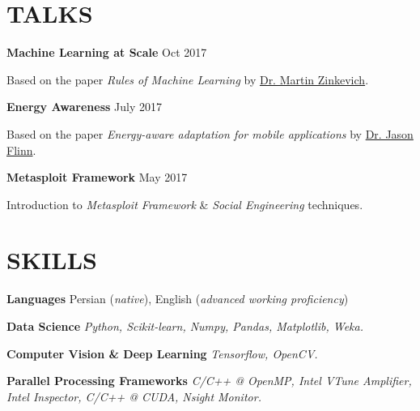 \documentclass[margin, 10pt]{res} %
\begin{document}
\section{TALKS} 
\textbf{Machine Learning at Scale}
\hfill {Oct 2017}
\vspace{0.15cm}
\begin{innerlist}
	\item Based on the paper \textit{Rules of Machine Learning} by \href{http://martin.zinkevich.org/rules_of_ml/rules_of_ml.pdf}{Dr. Martin Zinkevich}.
\end{innerlist}

\textbf{Energy Awareness}
\hfill {July 2017}
\vspace{0.15cm}
\begin{innerlist}
	\item Based on the paper \textit{Energy-aware adaptation for mobile applications} by \href{http://www-cgi.cs.cmu.edu/afs/cs.cmu.edu/Web/People/odyssey/docdir/s17.pdf5}{Dr. Jason Flinn}.
\end{innerlist}

\textbf{Metasploit Framework}
\hfill {May 2017}
\vspace{0.15cm}
\begin{innerlist}
	\item Introduction to \textit{Metasploit Framework} \& \textit{Social Engineering} techniques.
\end{innerlist}

	\section{SKILLS}
	
	\textbf{Languages }
	Persian (\emph{native}), English (\emph{advanced working proficiency})
	
	\textbf{Data Science}
	\textit{Python, Scikit-learn, Numpy, Pandas, Matplotlib, Weka.}
	
	\textbf{Computer Vision \& Deep Learning}
	\textit{Tensorflow, OpenCV.}
	
	\textbf{Parallel Processing Frameworks}
	\textit{C/C++ @ OpenMP, Intel VTune Amplifier, Intel Inspector, C/C++ @ CUDA, Nsight Monitor.}
	
\end{document}
